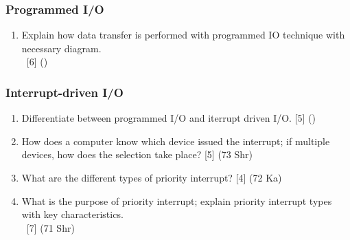 \documentclass[12pt]{article}
\newcommand{\enter}{\\\textcolor{white}{1}}
\begin{document}
	\subsubsection{Programmed I/O}
		\begin{enumerate}
			\item Explain how data transfer is performed with programmed IO technique with necessary diagram.
			\enter\hfill [6] ()
		\end{enumerate}

	\subsubsection{Interrupt-driven I/O}
		\begin{enumerate}
			\item Differentiate between programmed I/O and iterrupt driven I/O. \hfill [5] ()

			\item How does a computer know which device issued the interrupt; if multiple devices, how does the selection take place? \hfill [5] (73 Shr)
			
			\item What are the different types of priority interrupt? \hfill [4] (72 Ka)
			
			\item What is the purpose of priority interrupt; explain priority interrupt types with key characteristics. 
			\enter\hfill [7] (71 Shr)
		\end{enumerate}
\end{document}

